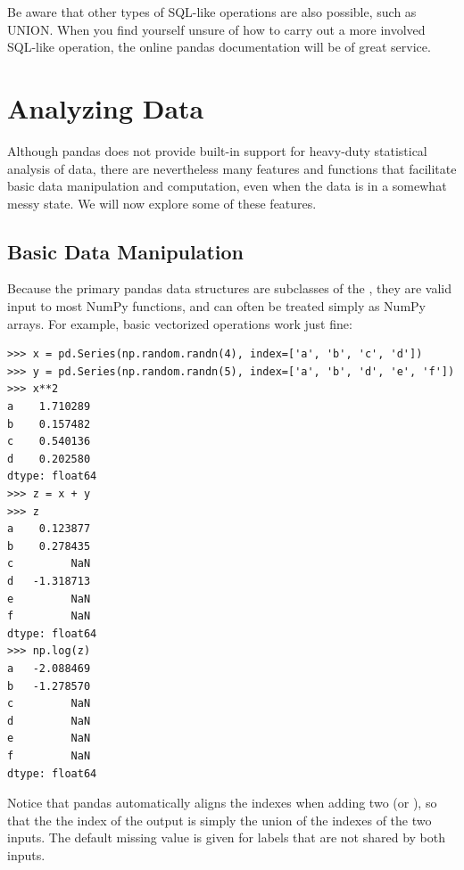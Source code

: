 Be aware that other types of SQL-like operations are also possible, such as UNION.
When you find yourself unsure of how to carry out a more involved SQL-like operation, the online
pandas documentation will be of great service.

\section*{Analyzing Data}
Although pandas does not provide built-in support for heavy-duty statistical analysis of data, there
are nevertheless many features and functions that facilitate basic data manipulation and computation,
even when the data is in a somewhat messy state. We will now explore some of these features.

\subsection*{Basic Data Manipulation}
Because the primary pandas data structures are subclasses of the , they are valid input
to most NumPy functions, and can often be treated simply as NumPy arrays. For example, basic
vectorized operations work just fine:
\begin{lstlisting}
>>> x = pd.Series(np.random.randn(4), index=['a', 'b', 'c', 'd'])
>>> y = pd.Series(np.random.randn(5), index=['a', 'b', 'd', 'e', 'f'])
>>> x**2
a    1.710289
b    0.157482
c    0.540136
d    0.202580
dtype: float64
>>> z = x + y
>>> z
a    0.123877
b    0.278435
c         NaN
d   -1.318713
e         NaN
f         NaN
dtype: float64
>>> np.log(z)
a   -2.088469
b   -1.278570
c         NaN
d         NaN
e         NaN
f         NaN
dtype: float64
\end{lstlisting}
Notice that pandas automatically aligns the indexes when adding two  (or ),
so that the the index of the output is simply the union of the indexes of the two inputs. The default
missing value  is given for labels that are not shared by both inputs. 

